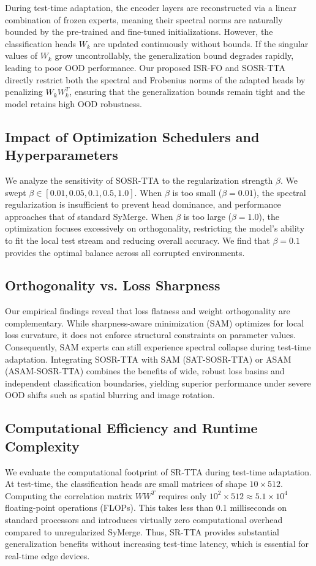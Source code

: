 \documentclass{article}
\theoremstyle{plain}
\theoremstyle{definition}
\theoremstyle{remark}
\begin{document}
During test-time adaptation, the encoder layers are reconstructed via a linear combination of frozen experts, meaning their spectral norms are naturally bounded by the pre-trained and fine-tuned initializations. However, the classification heads $W_k$ are updated continuously without bounds. If the singular values of $W_k$ grow uncontrollably, the generalization bound degrades rapidly, leading to poor OOD performance. Our proposed ISR-FO and SOSR-TTA directly restrict both the spectral and Frobenius norms of the adapted heads by penalizing $W_k W_k^T$, ensuring that the generalization bounds remain tight and the model retains high OOD robustness.

\subsection{Impact of Optimization Schedulers and Hyperparameters}
We analyze the sensitivity of SOSR-TTA to the regularization strength $\beta$. We swept $\beta \in [0.01, 0.05, 0.1, 0.5, 1.0]$. When $\beta$ is too small ($\beta = 0.01$), the spectral regularization is insufficient to prevent head dominance, and performance approaches that of standard SyMerge. When $\beta$ is too large ($\beta = 1.0$), the optimization focuses excessively on orthogonality, restricting the model's ability to fit the local test stream and reducing overall accuracy. We find that $\beta = 0.1$ provides the optimal balance across all corrupted environments.

\subsection{Orthogonality vs. Loss Sharpness}
Our empirical findings reveal that loss flatness and weight orthogonality are complementary. While sharpness-aware minimization (SAM) optimizes for local loss curvature, it does not enforce structural constraints on parameter values. Consequently, SAM experts can still experience spectral collapse during test-time adaptation. Integrating SOSR-TTA with SAM (SAT-SOSR-TTA) or ASAM (ASAM-SOSR-TTA) combines the benefits of wide, robust loss basins and independent classification boundaries, yielding superior performance under severe OOD shifts such as spatial blurring and image rotation.

\subsection{Computational Efficiency and Runtime Complexity}
We evaluate the computational footprint of SR-TTA during test-time adaptation. At test-time, the classification heads are small matrices of shape $10 \times 512$. Computing the correlation matrix $W W^T$ requires only $10^2 \times 512 \approx 5.1 \times 10^4$ floating-point operations (FLOPs). This takes less than 0.1 milliseconds on standard processors and introduces virtually zero computational overhead compared to unregularized SyMerge. Thus, SR-TTA provides substantial generalization benefits without increasing test-time latency, which is essential for real-time edge devices.
\end{document}
